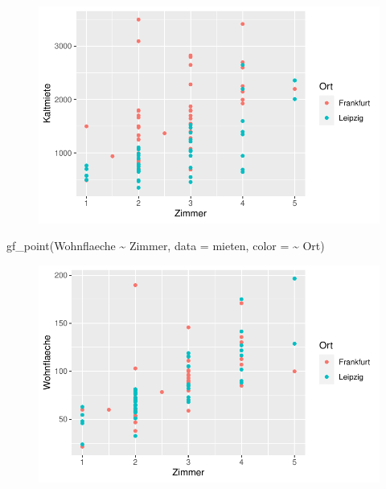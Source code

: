 \documentclass[
  a4paper,
  DIV=11]{scrartcl}
\newenvironment{Shaded}{\begin{snugshade}}{\end{snugshade}}
\newcommand{\AttributeTok}[1]{\textcolor[rgb]{0.40,0.45,0.13}{#1}}
\newcommand{\FunctionTok}[1]{\textcolor[rgb]{0.28,0.35,0.67}{#1}}
\newcommand{\NormalTok}[1]{\textcolor[rgb]{0.00,0.23,0.31}{#1}}
\newcommand{\SpecialCharTok}[1]{\textcolor[rgb]{0.37,0.37,0.37}{#1}}
\begin{document}
\begin{figure}[H]

{\centering \includegraphics{Mietmodellierung_files/figure-pdf/unnamed-chunk-14-1.pdf}

}

\end{figure}

\begin{Shaded}
\begin{Highlighting}[]
\FunctionTok{gf\_point}\NormalTok{(Wohnflaeche }\SpecialCharTok{\textasciitilde{}}\NormalTok{ Zimmer, }\AttributeTok{data =}\NormalTok{ mieten, }\AttributeTok{color =} \SpecialCharTok{\textasciitilde{}}\NormalTok{ Ort)}
\end{Highlighting}
\end{Shaded}

\begin{figure}[H]

{\centering \includegraphics{Mietmodellierung_files/figure-pdf/unnamed-chunk-14-2.pdf}

}

\end{figure}
\end{document}
